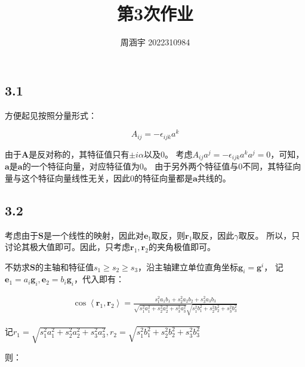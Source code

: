 \documentclass[UTF8,zihao=5]{ctexart}
\title{{\bfseries 第3次作业}}
\author{周涵宇 2022310984}
\date{}
\newcommand{\bm}[1]{{\mathbf{#1}}}
\begin{document}
\maketitle

\subsection*{3.1}

方便起见按照分量形式：

$$
A_{ij}=-\epsilon_{ijk}a^k
$$

由于$\bm{A}$是反对称的，其特征值只有$\pm i\alpha$以及$0$。
考虑$A_{ij}a^j=-\epsilon_{ijk}a^ka^j=0$，可知，$\bm{a}$是$\bm{a}$的一个特征向量，对应特征值为0。
由于另外两个特征值与0不同，其特征向量与这个特征向量线性无关，因此0的特征向量都是$\bm{a}$共线的。

\subsection*{3.2}

考虑由于$\bm{S}$是一个线性的映射，因此对$\bm{e}_1$取反，则$\bm{r}_1$取反，因此$\gamma$取反。
所以，只讨论其极大值即可。因此，只考虑$\bm{r}_1,\bm{r}_2$的夹角极值即可。

不妨求$\bm{S}$的主轴和特征值$s_1\geq s_2 \geq s_3$，沿主轴建立单位直角坐标$\bm{g}_i=\bm{g}^i$，
记$\bm{e}_1=a_i\bm{g}_i, \bm{e}_2=b_i\bm{g}_i$，代入即有：

\begin{equation}
    \begin{aligned}
        \cos{\left\langle \bm{r}_1,\bm{r}_2 \right\rangle}
        =\frac{s_1^2a_1b_1 + s_2^2a_2b_2 + s_3^2a_3b_3}{
            \sqrt{s_1^2a_1^2 + s_2^2a_2^2+s_3^2a_3^2}
            \sqrt{s_1^2b_1^2 + s_2^2b_2^2+s_3^2b_3^2}
        }
    \end{aligned}
\end{equation}

记$r_1=\sqrt{s_1^2a_1^2 + s_2^2a_2^2+s_3^2a_3^2}, r_2=\sqrt{s_1^2b_1^2 + s_2^2b_2^2+s_3^2b_3^2}$

则：
\end{document}
